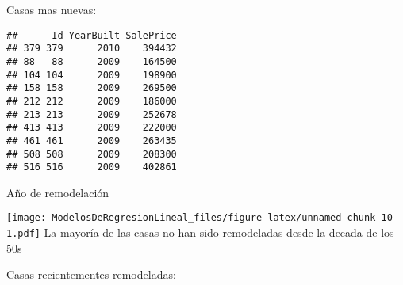 \documentclass[
]{article}
\newenvironment{Shaded}{\begin{snugshade}}{\end{snugshade}}
\newcommand{\AttributeTok}[1]{\textcolor[rgb]{0.77,0.63,0.00}{#1}}
\newcommand{\DecValTok}[1]{\textcolor[rgb]{0.00,0.00,0.81}{#1}}
\newcommand{\FunctionTok}[1]{\textcolor[rgb]{0.00,0.00,0.00}{#1}}
\newcommand{\NormalTok}[1]{#1}
\newcommand{\OtherTok}[1]{\textcolor[rgb]{0.56,0.35,0.01}{#1}}
\newcommand{\SpecialCharTok}[1]{\textcolor[rgb]{0.00,0.00,0.00}{#1}}
\newcommand{\StringTok}[1]{\textcolor[rgb]{0.31,0.60,0.02}{#1}}
\begin{document}
Casas mas nuevas:

\begin{Shaded}
\end{Shaded}

\begin{verbatim}
##      Id YearBuilt SalePrice
## 379 379      2010    394432
## 88   88      2009    164500
## 104 104      2009    198900
## 158 158      2009    269500
## 212 212      2009    186000
## 213 213      2009    252678
## 413 413      2009    222000
## 461 461      2009    263435
## 508 508      2009    208300
## 516 516      2009    402861
\end{verbatim}

Año de remodelación

\begin{Shaded}
\end{Shaded}

\texttt{[image: ModelosDeRegresionLineal\_files/figure-latex/unnamed-chunk-10-1.pdf]}
La mayoría de las casas no han sido remodeladas desde la decada de los
50s

Casas recientementes remodeladas:

\begin{Shaded}
\end{Shaded}
\end{document}
